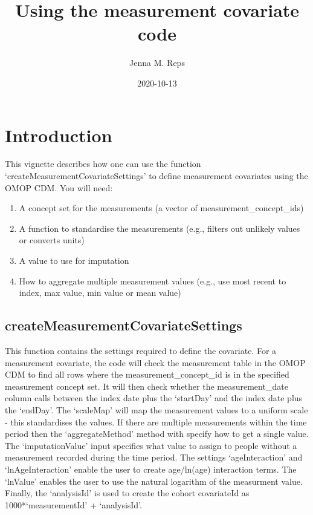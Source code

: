 \documentclass[
]{article}
\title{Using the measurement covariate code}
\author{Jenna M. Reps}
\date{2020-10-13}
\providecommand{\tightlist}{%
  \setlength{\itemsep}{0pt}\setlength{\parskip}{0pt}}
\begin{document}
\maketitle

{
\setcounter{tocdepth}{2}
\tableofcontents
}
\hypertarget{introduction}{%
\section{Introduction}\label{introduction}}

This vignette describes how one can use the function
`createMeasurementCovariateSettings' to define measurement covariates
using the OMOP CDM. You will need:

\begin{enumerate}
\def\labelenumi{\arabic{enumi}.}
\tightlist
\item
  A concept set for the measurements (a vector of
  measurement\_concept\_ids)
\item
  A function to standardise the measurements (e.g., filters out unlikely
  values or converts units)
\item
  A value to use for imputation
\item
  How to aggregate multiple measurement values (e.g., use most recent to
  index, max value, min value or mean value)
\end{enumerate}

\hypertarget{createmeasurementcovariatesettings}{%
\subsection{createMeasurementCovariateSettings}\label{createmeasurementcovariatesettings}}

This function contains the settings required to define the covariate.
For a measurement covariate, the code will check the measurement table
in the OMOP CDM to find all rows where the measurement\_concept\_id is
in the specified measurement concept set. It will then check whether the
measurement\_date column calls between the index date plus the
`startDay' and the index date plus the `endDay'. The `scaleMap' will map
the measurement values to a uniform scale - this standardises the
values. If there are multiple measurements within the time period then
the `aggregateMethod' method with specify how to get a single value. The
`imputationValue' input specifies what value to assign to people without
a measurement recorded during the time period. The settings
`ageInteraction' and `lnAgeInteraction' enable the user to create
age/ln(age) interaction terms. The `lnValue' enables the user to use the
natural logarithm of the measurment value. Finally, the `analysisId' is
used to create the cohort covariateId as 1000*`measurementId' +
`analysisId'.
\end{document}
